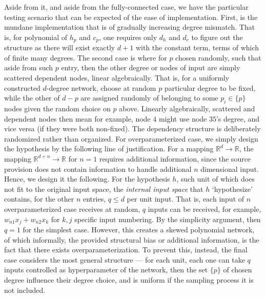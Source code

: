 \documentclass[
  journal=largetwo,
  year=2025,
  volume=37,
]{cup-journal}
\begin{document}
Aside from it, and aside from the fully-connected case, we have the particular testing scenario that can be expected of the ease of implementation. First, is the mundane implementation that is of gradually increasing degree mismatch. That is, for polynomial of $h_{p}$ and $c_{p}$, one requires only $d_{h}$ and $d_{c}$ to figure out the structure as there will exist exactly $d+1$ with the constant term, terms of which of finite many degrees. The second case is where for $p$ chosen randomly, such that aside from such $p$ entry, then the other degree or nodes of input are simply scattered dependent nodes, linear algebraically. That is, for a uniformly constructed $d$-degree network, choose at random $p$ particular degree to be fixed, while the other of $d-p$ are assigned randomly of belonging to some $p_{i}\in \{p\}$ nodes given the random choice on $p$ above. Linearly algebraically, scattered and dependent nodes then mean for example, node $4$ might use node $35$'s degree, and vice versa (if they were both non-fixed). The dependency structure is deliberately randomized rather than organized. For overparameterized case, we simply design the hypothesis by the following line of justification. For a mapping $\mathbb{R}^{d}\to\mathbb{R}$, the mapping $\mathbb{R}^{d+n}\to \mathbb{R}$ for $n= 1$ requires additional information, since the source provision does not contain information to handle additional $n$ dimensional input. Hence, we design it the following. For the hypothesis $h$, such unit of which does not fit to the original input space, the \textit{internal input space} that $h$ `hypothesize' contains, for the other $n$ entries, $q\leq d$ per unit input. That is, each input of $n$ overparameterized case receives at random, $q$ inputs can be received, for example, $w_{n1}x_{j}+w_{n2}x_{k}$ for $k,j$ specific input numbering. By the simplicity argument, then $q=1$ for the simplest case. However, this creates a skewed polynomial network, of which informally, the provided structural bias or additional information, is the fact that there exists overparameterization. To prevent this, instead, the final case considers the most general structure --- for each unit, each one can take $q$ inputs controlled as hyperparameter of the network, then the set $\{p\}$ of chosen degree influence their degree choice, and is uniform if the sampling process it is not included. 

\clearpage

\nocite{*}
\printbibliography
\end{document}
